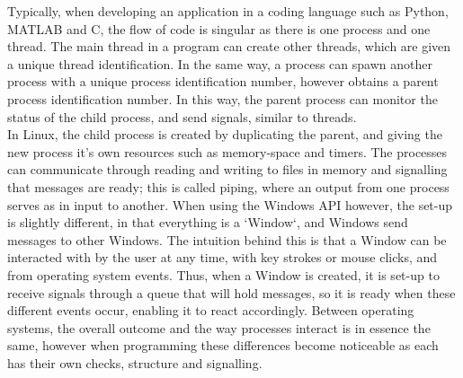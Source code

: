 \documentclass[12pt,openany,a4paper]{book}
\begin{document}
Typically, when developing an application in a coding language such as Python, MATLAB and C, the flow of code is singular as there is one process and one thread. The main thread in a program can create other threads, which are given a unique thread identification. In the same way, a process can spawn another process with a unique process identification number, however obtains a parent process identification number. In this way, the parent process can monitor the status of the child process, and send signals, similar to threads. \\
In Linux, the child process is created by duplicating the parent, and giving the new process it's own resources such as memory-space and timers. The processes can communicate through reading and writing to files in memory and signalling that messages are ready; this is called piping, where an output from one process serves as in input to another. When using the Windows API however, the set-up is slightly different, in that everything is a `Window`, and Windows send messages to other Windows. The intuition behind this is that a Window can be interacted with by the user at any time, with key strokes or mouse clicks, and from operating system events. Thus, when a Window is created, it is set-up to receive signals through a queue that will hold messages, so it is ready when these different events occur, enabling it to react accordingly. Between operating systems, the overall outcome and the way processes interact is in essence the same, however when programming these differences become noticeable as each has their own checks, structure and signalling.\\
\end{document}
